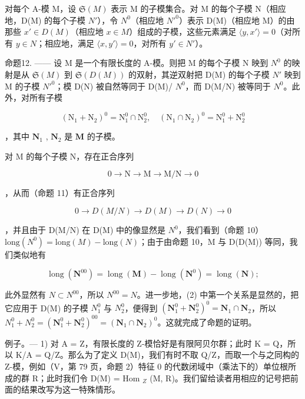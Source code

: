 对每个 A-模 M，设 \(\mathfrak{S}(M)\) 表示 M 的子模集合。对 M 的每个子模 N（相应地，D(M) 的每个子模 \(N'\)），令 \(N^0\)（相应地 \(N'^0\)）表示 D(M)（相应地 M）的由那些 \(x' \in D(M)\)（相应地 \(x \in M\)）组成的子模，这些元素满足 \(\langle y, x' \rangle = 0\)（对所有 \(y \in N\)；相应地，满足 \(\langle x, y' \rangle = 0\)，对所有 \(y' \in N'\)）。

命题12. —— 设 M 是一个有限长度的 A-模。则把 M 的每个子模 N 映到 \(N^{0}\) 的映射是从 \(\mathfrak{S}(M)\) 到 \(\mathfrak{S}(D(M))\) 的双射，其逆双射把 D(M) 的每个子模 \(N'\) 映到 M 的子模 \(N'^{0}\)；模 D(N) 被自然等同于 D(M)/ \(N^{0}\)，而 D(M/N) 被等同于 \(N^{0}\)。此外，对所有子模

\[
\left(\mathrm{N} _ {1} + \mathrm{N} _ {2}\right) ^ {0} = \mathrm{N} _ {1} ^ {0} \cap \mathrm{N} _ {2} ^ {0}, \quad \left(\mathrm{N} _ {1} \cap \mathrm{N} _ {2}\right) ^ {0} = \mathrm{N} _ {1} ^ {0} + \mathrm{N} _ {2} ^ {0}\tag{2}
\]

，其中 \(\mathbf{N}_1\) , \(\mathbf{N}_2\) 是 \(\mathbf{M}\) 的子模。

对 M 的每个子模 N，存在正合序列

\[
0 \rightarrow \mathrm{N} \rightarrow \mathrm{M} \rightarrow \mathrm{M} / \mathrm{N} \rightarrow 0
\]

，从而（命题 11）有正合序列

\[
0 \rightarrow D (M / N) \rightarrow D (M) \rightarrow D (N) \rightarrow 0
\]

，并且由于 D(M/N) 在 D(M) 中的像显然是 \(N^{0}\)，我们看到（命题 10）\(\text{long}(N^{0}) = \text{long}(M) - \text{long}(N)\)；由于由命题 10，M 与 D(D(M)) 等同，我们类似地有

\[
\operatorname{long} \left(\mathbf {N} ^ {0 0}\right) = \operatorname{long} (\mathbf {M}) - \operatorname{long} \left(\mathbf {N} ^ {0}\right) = \operatorname{long} (\mathbf {N});
\]

此外显然有 \(N \subset N^{00}\)，所以 \(N^{00} = N\)。进一步地，(2) 中第一个关系是显然的，把它应用于 D(M) 的子模 \(N_{1}^{0}\) 与 \(N_{2}^{0}\)，便得到 \((\mathbf{N}_{1}^{0} + \mathbf{N}_{2}^{0})^{0} = \mathbf{N}_{1} \cap \mathbf{N}_{2}\)，所以 \(N_{1}^{0} + N_{2}^{0} = (\mathbf{N}_{1}^{0} + \mathbf{N}_{2}^{0})^{00} = (\mathbf{N}_{1} \cap \mathbf{N}_{2})^{0}\)。这就完成了命题的证明。

例子。--- 1) 对 A = Z，有限长度的 Z-模恰好是有限阿贝尔群；此时 K = Q，所以 K/A = Q/Z。那么为了定义 D(M)，我们有时不取 Q/Z，而取一个与之同构的 Z-模，例如（V，第 79 页，命题 2）特征 0 的代数闭域中（乘法下的）单位根所成的群 R；此时我们令 D(M) = Hom \(_{Z}\) (M, R)。我们留给读者用相应的记号把前面的结果改写为这一特殊情形。

